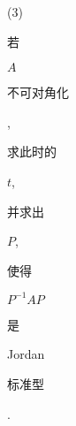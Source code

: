 \documentclass[10pt]{article}
\begin{document}
(3) \begin{CJK}{UTF8}{mj}若\end{CJK} $A$ \begin{CJK}{UTF8}{mj}不可对角化\end{CJK}, \begin{CJK}{UTF8}{mj}求此时的\end{CJK} $t$, \begin{CJK}{UTF8}{mj}并求出\end{CJK} $P$, \begin{CJK}{UTF8}{mj}使得\end{CJK} $P^{-1} A P$ \begin{CJK}{UTF8}{mj}是\end{CJK} Jordan \begin{CJK}{UTF8}{mj}标准型\end{CJK}.
\end{document}
